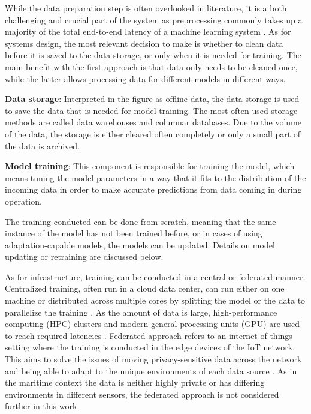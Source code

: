 While the data preparation step is often overlooked in literature,
it is a both challenging and crucial part of the system as preprocessing commonly takes up a majority of the total end-to-end latency of a machine learning system \cite{adaptivelearningsystems}. As for systems design, the most relevant decision to make is whether to clean data before it is saved to the data storage, or only when it is  needed for training. The main benefit with the first approach is that data only needs to be cleaned once, while the latter allows processing data for different models in different ways.

\textbf{Data storage}: Interpreted in the figure as offline data, the data storage is used to save the data that is needed for model training. The most often used storage methods are called data warehouses and columnar databases. Due to the volume of the data, the storage is either cleared often completely or only a small part of the data is archived.

\textbf{Model training}: This component is responsible for training the model, which means tuning the model parameters in a way that it fits to the distribution of the incoming data in order to make accurate predictions from data coming in during operation.

The training conducted can be done from scratch, meaning that the same instance of the model has not been trained before, or in cases of using adaptation-capable models, the models can be updated. Details on model updating or retraining are discussed below.

As for infrastructure, training can be conducted in a central or federated manner. Centralized training, often run in a cloud data center, can run either on one machine or distributed across multiple cores by splitting the model or the data to parallelize the training \cite{iotsurvey}. As the amount of data is large, high-performance computing (HPC) clusters and modern general processing units (GPU) are used to reach required latencies \cite{iotsurvey}. Federated approach refers to an internet of things setting where the training is conducted in the edge devices of the IoT network. This aims to solve the issues of moving privacy-sensitive data across the network and being able to adapt to the unique environments of each data source \cite{iotsurvey}. As in the maritime context the data is neither highly private or has differing environments in different sensors, the federated approach is not considered further in this work.

